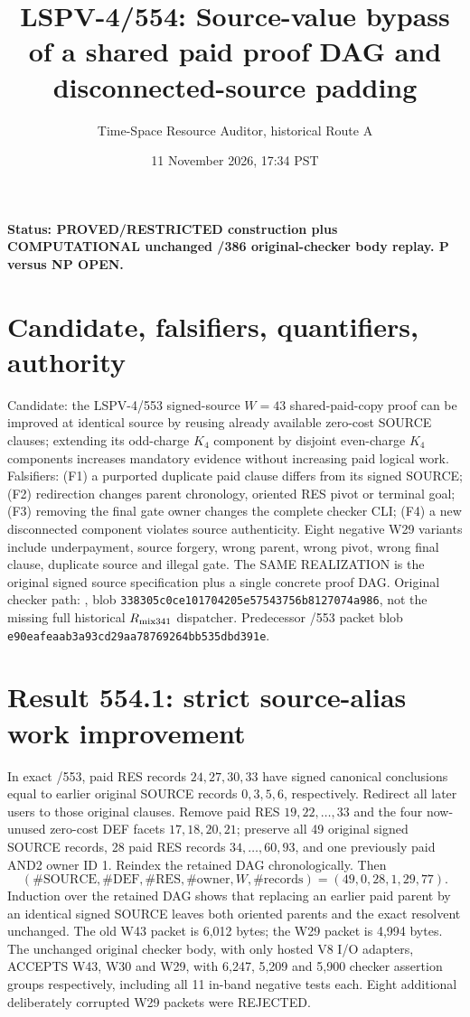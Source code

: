 \documentclass[11pt]{article}
\title{LSPV-4/554: Source-value bypass of a shared paid proof DAG and disconnected-source padding}
\author{Time-Space Resource Auditor, historical Route A}
\date{11 November 2026, 17:34 PST}
\begin{document}
\maketitle
\noindent\textbf{Status: PROVED/RESTRICTED construction plus COMPUTATIONAL unchanged /386 original-checker body replay. P versus NP OPEN.}

\section*{Candidate, falsifiers, quantifiers, authority}
Candidate: the LSPV-4/553 signed-source $W=43$ shared-paid-copy proof can be improved at identical source by reusing already available zero-cost SOURCE clauses; extending its odd-charge $K_4$ component by disjoint even-charge $K_4$ components increases mandatory evidence without increasing paid logical work. Falsifiers: (F1) a purported duplicate paid clause differs from its signed SOURCE; (F2) redirection changes parent chronology, oriented RES pivot or terminal goal; (F3) removing the final gate owner changes the complete checker CLI; (F4) a new disconnected component violates source authenticity. Eight negative W29 variants include underpayment, source forgery, wrong parent, wrong pivot, wrong final clause, duplicate source and illegal gate. The SAME REALIZATION is the original signed source specification plus a single concrete proof DAG. Original checker path: , blob \texttt{338305c0ce101704205e57543756b8127074a986}, not the missing full historical $R_{\rm mix341}$ dispatcher. Predecessor /553 packet blob \texttt{e90eafeaab3a93cd29aa78769264bb535dbd391e}.

\section*{Result 554.1: strict source-alias work improvement}
In exact /553, paid RES records $24,27,30,33$ have signed canonical conclusions equal to earlier original SOURCE records $0,3,5,6$, respectively. Redirect all later users to those original clauses. Remove paid RES $19,22,\ldots,33$ and the four now-unused zero-cost DEF facets $17,18,20,21$; preserve all 49 original signed SOURCE records, 28 paid RES records $34,\ldots,60,93$, and one previously paid AND2 owner ID 1. Reindex the retained DAG chronologically. Then
\[
 (\#\mathrm{SOURCE},\#\mathrm{DEF},\#\mathrm{RES},\#\mathrm{owner},W,\#\mathrm{records})=(49,0,28,1,29,77).
\]
Induction over the retained DAG shows that replacing an earlier paid parent by an identical signed SOURCE leaves both oriented parents and the exact resolvent unchanged. The old W43 packet is 6,012 bytes; the W29 packet is 4,994 bytes. The unchanged original checker body, with only hosted V8 I/O adapters, ACCEPTS W43, W30 and W29, with 6,247, 5,209 and 5,900 checker assertion groups respectively, including all 11 in-band negative tests each. Eight additional deliberately corrupted W29 packets were REJECTED.
\end{document}
